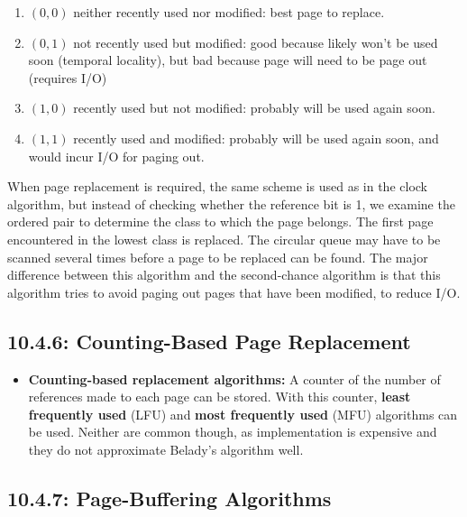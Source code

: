 \documentclass[12pt]{article}
\begin{document}
\begin{itemize}
\begin{enumerate}
            \item \((0,0)\) neither recently used nor modified: best page to replace.
            \item \((0,1)\) not recently used but modified: good because likely won't be used soon (temporal locality), but bad because page will need to be page out (requires I/O)
            \item \((1,0)\) recently used but not modified: probably will be used again soon.
            \item \((1,1)\) recently used and modified: probably will be used again soon, and would incur I/O for paging out.
        \end{enumerate}
        When page replacement is required, the same scheme is used as in the clock algorithm, but instead of checking whether the reference bit is 1, we examine the ordered pair to determine the class to which the page belongs. The first page encountered in the lowest class is replaced. The circular queue may have to be scanned several times before a page to be replaced can be found. The major difference between this algorithm and the second-chance algorithm is that this algorithm tries to avoid paging out pages that have been modified, to reduce I/O.
\end{itemize}

\subsection*{10.4.6: Counting-Based Page Replacement}

\begin{itemize}
    \item \textbf{Counting-based replacement algorithms:} A counter of the number of references made to each page can be stored. With this counter, \textbf{least frequently used} (LFU) and \textbf{most frequently used} (MFU) algorithms can be used. Neither are common though, as implementation is expensive and they do not approximate Belady's algorithm well.
\end{itemize}

\subsection*{10.4.7: Page-Buffering Algorithms}
\end{document}
